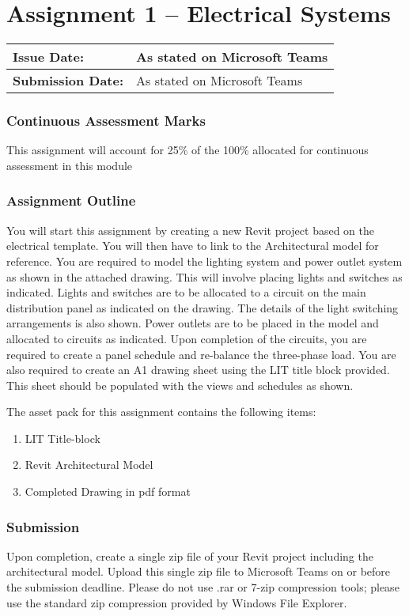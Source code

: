 
	
\part*{Assignment 1 – Electrical Systems}

\begin{tabularx}{\textwidth}{ |X|X| }
	\hline
	\textbf{Issue Date:} & As stated on Microsoft Teams \\
	\hline 
	\textbf{Submission Date:}  & As stated on Microsoft Teams  \\
	\hline
\end{tabularx}


\section*{Continuous Assessment Marks}
This assignment will account for 25\% of the 100\% allocated for continuous assessment in this module

\section*{Assignment Outline}
You will start this assignment by creating a new Revit project based on the electrical template. You will then have to link to the Architectural model for reference.
You are required to model the lighting system and power outlet system as shown in the attached drawing. This will involve placing lights and switches as indicated. Lights and switches are to be allocated to a circuit on the main distribution panel as indicated on the drawing. The details of the light switching arrangements is also shown.
Power outlets are to be placed in the model and allocated to circuits as indicated.
Upon completion of the circuits, you are required to create a panel schedule and re-balance the three-phase load.
You are also required to create an A1 drawing sheet using the LIT title block provided. This sheet should be populated with the views and schedules as shown.

The asset pack for this assignment contains the following items:
\begin{enumerate}
	\item LIT Title-block
	\item Revit Architectural Model
	\item Completed Drawing in pdf format
\end{enumerate}


\section*{Submission}
Upon completion, create a single zip file of your Revit project including the architectural model. Upload this single zip file to Microsoft Teams on or before the submission deadline.  Please do not use .rar or 7-zip compression tools; please use the standard zip compression provided by Windows File Explorer.

